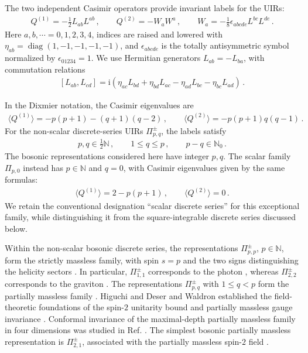 \documentclass{SciPost}
\begin{document}
The two independent Casimir operators provide invariant labels for the UIRs:
\begin{align} \label{eq:discrete-casimirs-def}
    Q^{(1)} = -\frac{1}{2}L_{ab}L^{ab}
    \,, \qquad
    Q^{(2)} = -W_aW^a
    \,, \qquad
    W_a = -\frac{1}{8}\epsilon_{abcde}L^{bc}L^{de} \,.
\end{align}
Here $a,b,\cdots=0,1,2,3,4$, indices are raised and lowered with $\eta_{ab}=\operatorname{diag}(1,-1,-1,-1,-1)$, and $\epsilon_{abcde}$ is the totally antisymmetric symbol normalized by $\epsilon_{01234}=1$. We use Hermitian generators $L_{ab}=-L_{ba}$, with commutation relations 
\begin{align} \label{eq:so14-commutation}
    [L_{ab},L_{cd}]
    =
    \mathrm{i}\left(
        \eta_{ac}L_{bd}
        +\eta_{bd}L_{ac}
        -\eta_{ad}L_{bc}
        -\eta_{bc}L_{ad}
    \right) \,.
\end{align}

In the Dixmier notation, the Casimir eigenvalues are
\begin{align} \label{eq:discrete-casimirs}
    \langle Q^{(1)}\rangle = -p(p+1)-(q+1)(q-2)
    \,, \qquad
    \langle Q^{(2)}\rangle = -p(p+1)q(q-1) \,.
\end{align}
For the non-scalar discrete-series UIRs $\Pi^\pm_{p,q}$, the labels satisfy
\begin{align}\label{range}
    p,q\in\frac{1}{2}\mathbb{N}
    \,, \qquad
    1\leqslant q\leqslant p
    \,, \qquad
    p-q\in\mathbb{N}_0 \,.
\end{align}
The bosonic representations considered here have integer $p,q$. The scalar family $\Pi_{p,0}$ instead has $p\in\mathbb{N}$ and $q=0$, with Casimir eigenvalues given by the same formulas:
\begin{align}
    \langle Q^{(1)}\rangle = 2-p(p+1)
    \,, \qquad
    \langle Q^{(2)}\rangle = 0 \,.
\end{align}
We retain the conventional designation ``scalar discrete series'' for this exceptional family, while distinguishing it from the square-integrable discrete series discussed below.

Within the non-scalar bosonic discrete series, the representations $\Pi^\pm_{p,p}$, $p\in\mathbb{N}$, form the strictly massless family, with spin $s=p$ and the two signs distinguishing the helicity sectors \cite{Gazeau2026, Gazeau2024, Gazeau2025, Barut, Todorov, Mack}. In particular, $\Pi^\pm_{1,1}$ corresponds to the photon \cite{takVec}, whereas $\Pi^\pm_{2,2}$ corresponds to the graviton \cite{GravGB}. The representations $\Pi^\pm_{p,q}$ with $1\leqslant q<p$ form the partially massless family \cite{Gazeau2024}. Higuchi and Deser and Waldron established the field-theoretic foundations of the spin-$2$ unitarity bound and partially massless gauge invariance \cite{Higuchi1987, DeserWaldron2001}. Conformal invariance of the maximal-depth partially massless family in four dimensions was studied in Ref. \cite{DeserWaldron2004}. The simplest bosonic partially massless representation is $\Pi^\pm_{2,1}$, associated with the partially massless spin-$2$ field \cite{GravPartially}.
\end{document}
